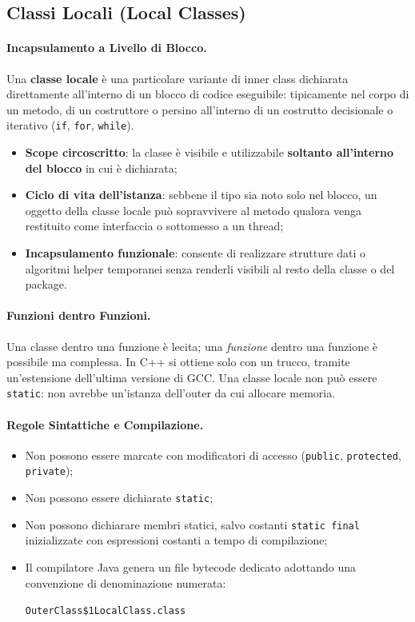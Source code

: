 \documentclass[12pt]{extarticle}
\begin{document}
\subsection{Classi Locali (Local Classes)}

\paragraph{Incapsulamento a Livello di Blocco.}
Una \textbf{classe locale} è una particolare variante di inner class dichiarata direttamente all'interno di un blocco di codice eseguibile: tipicamente nel corpo di un metodo, di un costruttore o persino all'interno di un costrutto decisionale o iterativo (\texttt{if}, \texttt{for}, \texttt{while}).
\begin{itemize}
    \item \textbf{Scope circoscritto}: la classe è visibile e utilizzabile \textbf{soltanto all'interno del blocco} in cui è dichiarata;
    \item \textbf{Ciclo di vita dell'istanza}: sebbene il tipo sia noto solo nel blocco, un oggetto della classe locale può sopravvivere al metodo qualora venga restituito come interfaccia o sottomesso a un thread;
    \item \textbf{Incapsulamento funzionale}: consente di realizzare strutture dati o algoritmi helper temporanei senza renderli visibili al resto della classe o del package.
\end{itemize}

\paragraph{Funzioni dentro Funzioni.}
Una classe dentro una funzione è lecita; una \textit{funzione} dentro una funzione è possibile ma complessa. In C++ si ottiene solo con un trucco, tramite un'estensione dell'ultima versione di GCC. Una classe locale non può essere \texttt{static}: non avrebbe un'istanza dell'outer da cui allocare memoria.

\paragraph{Regole Sintattiche e Compilazione.}
\begin{itemize}
    \item Non possono essere marcate con modificatori di accesso (\texttt{public}, \texttt{protected}, \texttt{private});
    \item Non possono essere dichiarate \texttt{static};
    \item Non possono dichiarare membri statici, salvo costanti \texttt{static final} inizializzate con espressioni costanti a tempo di compilazione;
    \item Il compilatore Java genera un file bytecode dedicato adottando una convenzione di denominazione numerata:
    \begin{center}
        \texttt{OuterClass\$1LocalClass.class}
    \end{center}
\end{itemize}
\end{document}
